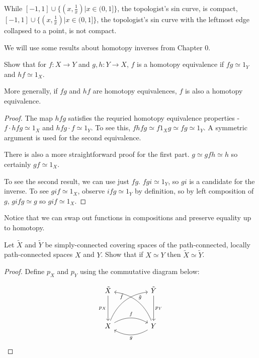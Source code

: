 \documentclass[10pt]{article}
\begin{document}
\begin{definition}
\begin{definition}
\begin{note}
	While $[-1, 1] \cup \{ (x, \frac{1}{x}) | x \in (0, 1] \}$, the topologist's
	sin curve, is compact, $[-1, 1] \cup \{ (x, \frac{1}{x}) | x \in (0, 1] \}$,
	the topologist's sin curve with the leftmost edge collapsed to a point, is
	not compact.
\end{note}

We will use some results about homotopy inverses from Chapter 0.

\begin{exercise}
	Show that for $f: X \to Y$ and $g, h: Y \to X$, $f$ is a homotopy equivalence if $fg
	\simeq 1_Y$ and $hf \simeq 1_X$.

	More generally, if $fg$ and $hf$ are homotopy equivalences, $f$ is also a
	homotopy equivalence.
\end{exercise}

\begin{proof}
	The map $hfg$ satisfies the requried homotopy equivalence properties - $f \cdot hfg
	\simeq 1_X$ and  $hfg \cdot f \simeq 1_Y$. To see this, $fhfg \simeq f1_Xg
	\simeq fg \simeq 1_Y$. A symmetric argument is used for the second
	equivalence.

	There is also a more straightforward proof for the first part. $g \simeq gfh \simeq h$ so certainly
	$gf \simeq 1_X$.

	To see the second result, we can use just $fg$. $fgi \simeq 1_Y$, so $gi$ is
	a candidate for the inverse. To see $gif \simeq 1_X$, observe $ifg \simeq
	1_Y$ by definition, so by left composition of $g$, $gifg \simeq g$ so $gif
	\simeq 1_X$.
\end{proof}

Notice that we can swap out functions in compositions and preserve
equality up to homotopy.

\begin{exercise}
	Let $\tilde{X}$ and $\tilde{Y}$ be simply-connected covering spaces of the
	path-connected, locally path-connected spaces $X$ and $Y$. Show that if
	$X \simeq Y$ then $\tilde{X} \simeq \tilde{Y}$.
\end{exercise}

\begin{proof}

	Define $p_X$ and $p_Y$ using the commutative diagram below:

	\[
\begin{tikzcd}
\tilde{X} \arrow[dd, "p_X"']                                      &  & \tilde{Y} \arrow[dd, "p_Y"]                                         \\
                                                                  &  &                                                                     \\
X \arrow[rr, "f", bend left] \arrow[rruu, "\tilde{f}", bend left] &  & Y \arrow[ll, "g", bend left] \arrow[lluu, "\tilde{g}"', bend right]
\end{tikzcd}
\]


\end{proof}
\end{definition}
\end{definition}
\end{document}
